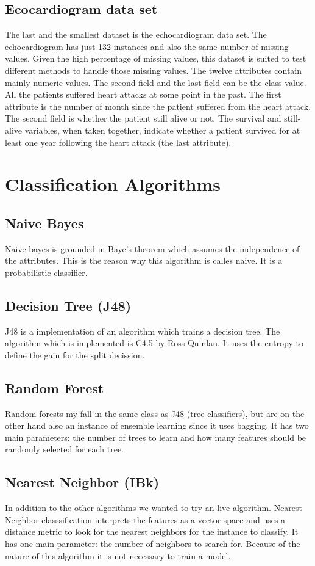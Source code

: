 \documentclass[a4paper]{article}
\begin{document}
\subsection{Ecocardiogram data set}
The last and the smallest dataset is the echocardiogram data set. The
echocardiogram has just 132 instances and also the same number of missing
values. Given the high percentage of
missing values, this dataset is suited to test different methods to handle those
missing values. The twelve attributes contain mainly numeric values. The second
field and the last field can be the class value. All the patients suffered heart
attacks at some point in the past. The first attribute is the number of month
since the patient suffered from the heart attack. 
The second field is whether the patient still
alive or not. The survival and still-alive variables, when taken together,
indicate whether a patient survived for at least one year following the heart
attack (the last attribute). 

\section{Classification Algorithms}
    \subsection{Naive Bayes}
    Naive bayes is grounded in Baye's theorem which assumes the independence of
    the attributes. This is the reason why this algorithm is calles naive. It is
    a probabilistic classifier. 
    \subsection{Decision Tree (J48)}
    J48 is a implementation of an algorithm which trains a decision tree. The
    algorithm which is implemented is C4.5 by Ross Quinlan. It uses the entropy
    to define the gain for the split decission.
    \subsection{Random Forest}
    Random forests my fall in the same class as J48 (tree classifiers), but are
    on the other hand also an instance of ensemble learning since it uses
    bagging. It has two main parameters: the number of trees to learn and how
    many features should be randomly selected for each tree. 
    \subsection{Nearest Neighbor (IBk)}
    In addition to the other algorithms we wanted to try an live algorithm.
    Nearest Neighbor classsification interprets the features as a vector space
    and uses a distance metric to look for the nearest neighbors for the
    instance to classify. It has one main parameter: the number of neighbors to
    search for. Because of the nature of this algorithm it is not necessary to
    train a model. 
\end{document}
